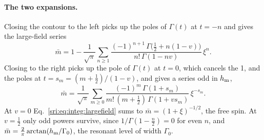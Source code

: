\paragraph{The two expansions.} Closing the contour to the left picks up the poles of $\Gamma(t)$ at $t=-n$ and gives
the large-field series
\begin{equation}
 \bar m=1-\frac1{\sqrt\pi}\sum_{n\ge1}\frac{(-1)^{n+1}\,\Gamma\bigl(\frac12+n(1-v)\bigr)}{n!\,\Gamma(1-nv)}\,\xi^n .
 \label{sri:eq:integ:largefield}
\end{equation}
Closing to the right picks up the pole of $\Gamma(t)$ at $t=0$, which cancels the 1, and the poles at
$t=s_m=(m+\frac12)/(1-v)$, and gives a series odd in $h_{\rm m}$,
\begin{equation}
 \bar m=\frac1{\sqrt\pi}\sum_{m\ge0}\frac{(-1)^m\,\Gamma(1+s_m)}{m!\,(m+\frac12)\,\Gamma(1+vs_m)}\,\xi^{-s_m}.
\end{equation}
At $v=0$ Eq.~\eqref{sri:eq:integ:largefield} sums to $\bar m=(1+\xi)^{-1/2}$, the free spin. At $v=\frac12$ only odd
powers survive, since $1/\Gamma(1-\frac n2)=0$ for even $n$, and $\bar m=\frac2\pi\arctan(h_{\rm m}/\Gamma_0)$, the
resonant level of width $\Gamma_0$.


